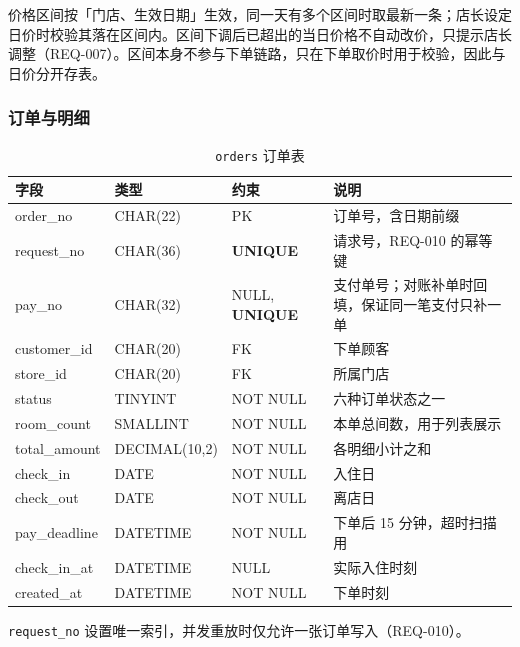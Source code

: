 价格区间按「门店、生效日期」生效，同一天有多个区间时取最新一条；店长设定日价时校验其落在区间内。区间下调后已超出的当日价格不自动改价，只提示店长调整（REQ-007）。区间本身不参与下单链路，只在下单取价时用于校验，因此与日价分开存表。

\subsubsection{订单与明细}

\begin{table}[H]
\centering
\caption{\texttt{orders} 订单表}
\tabfont
\begin{tabularx}{\textwidth}{@{}L{3.0cm}L{3.0cm}L{2.8cm}X@{}}
\toprule
字段 & 类型 & 约束 & 说明 \\
\midrule
order\_no & CHAR(22) & PK & 订单号，含日期前缀 \\
request\_no & CHAR(36) & \textbf{UNIQUE} & 请求号，REQ-010 的幂等键 \\
pay\_no & CHAR(32) & NULL, \textbf{UNIQUE} & 支付单号；对账补单时回填，保证同一笔支付只补一单 \\
customer\_id & CHAR(20) & FK & 下单顾客 \\
store\_id & CHAR(20) & FK & 所属门店 \\
status & TINYINT & NOT NULL & 六种订单状态之一 \\
room\_count & SMALLINT & NOT NULL & 本单总间数，用于列表展示 \\
total\_amount & DECIMAL(10,2) & NOT NULL & 各明细小计之和 \\
check\_in & DATE & NOT NULL & 入住日 \\
check\_out & DATE & NOT NULL & 离店日 \\
pay\_deadline & DATETIME & NOT NULL & 下单后 15 分钟，超时扫描用 \\
check\_in\_at & DATETIME & NULL & 实际入住时刻 \\
created\_at & DATETIME & NOT NULL & 下单时刻 \\
\bottomrule
\end{tabularx}
\end{table}

\texttt{request\_no} 设置唯一索引，并发重放时仅允许一张订单写入（REQ-010）。

